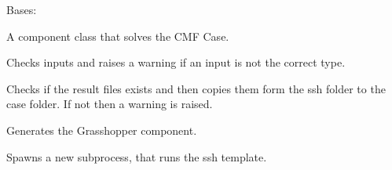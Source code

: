 \documentclass[letterpaper,10pt,english]{sphinxmanual}
\begin{document}

\begin{fulllineitems}
\label{\detokenize{cmf:livestock.components.comp_cmf.CMFSolve}}
Bases: {\hyperref[\detokenize{superclass:livestock.components.component.GHComponent}]{}}

A component class that solves the CMF Case.

\begin{fulllineitems}
\label{\detokenize{cmf:livestock.components.comp_cmf.CMFSolve.check_inputs}}
Checks inputs and raises a warning if an input is not the correct type.

\end{fulllineitems}


\begin{fulllineitems}
\label{\detokenize{cmf:livestock.components.comp_cmf.CMFSolve.check_results}}
Checks if the result files exists and then copies them form the ssh folder to the case folder.
If not then a warning is raised.

\end{fulllineitems}


\begin{fulllineitems}
\label{\detokenize{cmf:livestock.components.comp_cmf.CMFSolve.config}}
Generates the Grasshopper component.

\end{fulllineitems}


\begin{fulllineitems}
\label{\detokenize{cmf:livestock.components.comp_cmf.CMFSolve.do_case}}
Spawns a new subprocess, that runs the ssh template.


\end{fulllineitems}
\end{fulllineitems}
\end{document}
